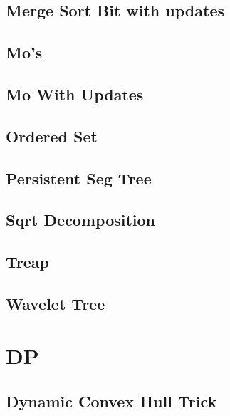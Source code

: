 \subsection{Merge Sort Bit with updates}
\raggedbottom
\hrulefill
\subsection{Mo's}
\raggedbottom
\hrulefill
\subsection{Mo With Updates}
\raggedbottom
\hrulefill
\subsection{Ordered Set}
\raggedbottom
\hrulefill
\subsection{Persistent Seg Tree}
\raggedbottom
\hrulefill
\subsection{Sqrt Decomposition}
\raggedbottom
\hrulefill
\subsection{Treap}
\raggedbottom
\hrulefill
\subsection{Wavelet Tree}
\raggedbottom
\hrulefill

\section{DP}
\subsection{Dynamic Convex Hull Trick}
\raggedbottom
\hrulefill
